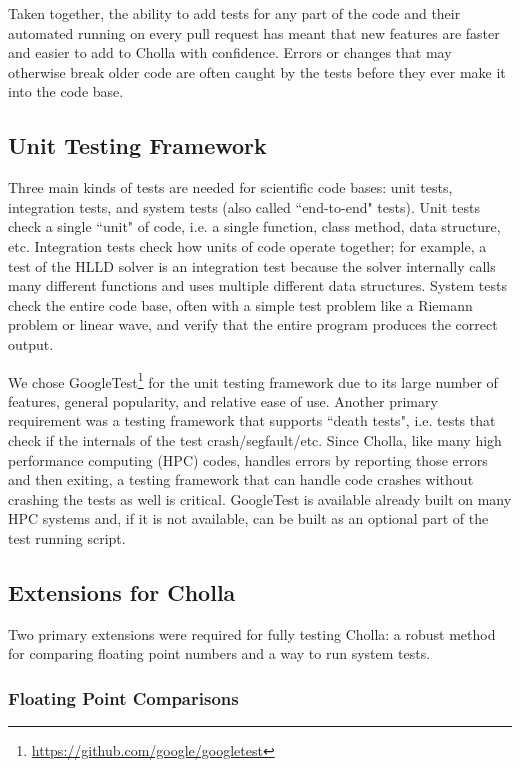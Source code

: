 \documentclass[modern, linenumbers]{aastex631}
\begin{document}
Taken together, the ability to add tests for any part of the code and their automated running on every pull request has meant that new features are faster and easier to add to Cholla with confidence. Errors or changes that may otherwise break older code are often caught by the tests before they ever make it into the code base.

\subsection{Unit Testing Framework}
\label{sec:testing-framework}

Three main kinds of tests are needed for scientific code bases: unit tests, integration tests, and system tests (also called ``end-to-end" tests). Unit tests check a single ``unit" of code, i.e. a single function, class method, data structure, etc. Integration tests check how units of code operate together; for example, a test of the HLLD solver is an integration test because the solver internally calls many different functions and uses multiple different data structures. System tests check the entire code base, often with a simple test problem like a Riemann problem or linear wave, and verify that the entire program produces the correct output.

We chose GoogleTest\footnote{\url{https://github.com/google/googletest}} for the unit testing framework due to its large number of features, general popularity, and relative ease of use. Another primary requirement was a testing framework that supports ``death tests", i.e. tests that check if the internals of the test crash/segfault/etc. Since Cholla, like many high performance computing (HPC) codes, handles errors by reporting those errors and then exiting, a testing framework that can handle code crashes without crashing the tests as well is critical. GoogleTest is available already built on many HPC systems and, if it is not available, can be built as an optional part of the test running script.

\subsection{Extensions for Cholla}

Two primary extensions were required for fully testing Cholla: a robust method for comparing floating point numbers and a way to run system tests.

\subsubsection{Floating Point Comparisons}
\label{sec:fp-comparing}
\end{document}
